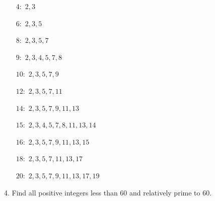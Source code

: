\begin{mdframed}[style=darkAnswer,frametitle={Joe Starr}]
  \begin{multicols}{2}
    \begin{itemize}
      \item[$4:$]  {$2, 3$}
      \item[$6:$]  {$2, 3, 5$}
      \item[$8:$]  {$2, 3, 5, 7$}
      \item[$9:$]  {$2, 3, 4, 5, 7, 8$}
      \item[$10:$] {$2, 3, 5, 7, 9$}
      \item[$12:$] {$2, 3, 5, 7, 11$}
      \item[$14:$] {$2, 3, 5, 7, 9, 11, 13$}
      \item[$15:$] {$2, 3, 4, 5, 7, 8, 11, 13, 14$}
      \item[$16:$] {$2, 3, 5, 7, 9, 11, 13, 15$}
      \item[$18:$] {$2, 3, 5, 7, 11, 13, 17$}
      \item[$20:$] {$2, 3, 5, 7, 9, 11, 13, 17, 19$}
    \end{itemize}
  \end{multicols}
\end{mdframed}
\newpage
\begin{mdframed}[style=darkQuesion]
  4. Find all positive integers less than 60 and relatively prime to $60$.
\end{mdframed}


